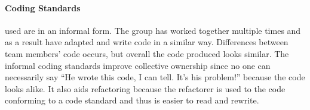 \paragraph{Coding Standards} used are in an informal form. The group has worked together multiple times and as a result have adapted and write code in a similar way. Differences between team members' code occurs, but overall the code produced looks similar. The informal coding standards improve collective ownership since no one can necessarily say ``He wrote this code, I can tell. It's his problem!'' because the code looks alike. It also aids refactoring because the refactorer is used to the code conforming to a code standard and thus is easier to read and rewrite.

